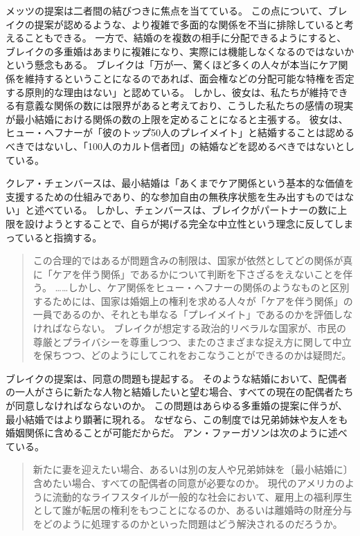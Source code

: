 \documentclass[paper=a4,book,openany]{jlreq} \usepackage{mystyle}
\begin{document}
メッツの提案は二者間の結びつきに焦点を当てている。
この点について、ブレイクの提案が認めるような、より複雑で多面的な関係を不当に排除していると考えることもできる。
一方で、結婚のを複数の相手に分配できるようにすると、ブレイクの多重婚はあまりに複雑になり、実際には機能しなくなるのではないかという懸念もある。
ブレイクは「万が一、驚くほど多くの人々が本当にケア関係を維持するということになるのであれば、面会権などの分配可能な特権を否定する原則的な理由はない」と認めている\citep[p.140]{brake12:_minim_marriag}。
しかし、彼女は、私たちが維持できる有意義な関係の数には限界があると考えており、こうした私たちの感情の現実が最小結婚における関係の数の上限を定めることになると主張する。
彼女は、ヒュー・ヘフナーが「彼のトップ50人のプレイメイト」と結婚することは認めるべきではないし、「100人のカルト信者団」の結婚などを認めるべきではないとしている\citep[p.164]{brake12:_minim_marriag}。

クレア・チェンバースは、最小結婚は「あくまでケア関係という基本的な価値を支援するための仕組みであり、的な参加自由の無秩序状態を生み出すものではない」と述べている\citep[p.96]{chambers17:againstmarriage}。
しかし、チェンバースは、ブレイクがパートナーの数に上限を設けようとすることで、自らが掲げる完全な中立性という理念に反してしまっていると指摘する。

\begin{quote}
この合理的ではあるが問題含みの制限は、国家が依然としてどの関係が真に「ケアを伴う関係」であるかについて判断を下さざるをえないことを伴う。
……しかし、ケア関係をヒュー・ヘフナーの関係のようなものと区別するためには、国家は婚姻上の権利を求める人々が「ケアを伴う関係」の一員であるのか、それとも単なる「プレイメイト」であるのかを評価しなければならない。
ブレイクが想定する政治的リベラルな国家が、市民の尊厳とプライバシーを尊重しつつ、またのさまざまな捉え方に関して中立を保ちつつ、どのようにしてこれをおこなうことができるのかは疑問だ。
\citep[p.96]{chambers17:againstmarriage}
\end{quote}

ブレイクの提案は、同意の問題も提起する。
そのような結婚において、配偶者の一人がさらに新たな人物と結婚したいと望む場合、すべての現在の配偶者たちが同意しなければならないのか。
この問題はあらゆる多重婚の提案に伴うが、最小結婚ではより顕著に現れる。
なぜなら、この制度では兄弟姉妹や友人をも婚姻関係に含めることが可能だからだ。
アン・ファーガソンは次のように述べている。

\begin{quote}
新たに妻を迎えたい場合、あるいは別の友人や兄弟姉妹を〔最小結婚に〕含めたい場合、すべての配偶者の同意が必要なのか。
現代のアメリカのように流動的なライフスタイルが一般的な社会において、雇用上の福利厚生として誰が転居の権利をもつことになるのか、あるいは離婚時の財産分与をどのように処理するのかといった問題はどう解決されるのだろうか。
\citep{ferguson14:_review_brake}
\end{quote}
\end{document}
